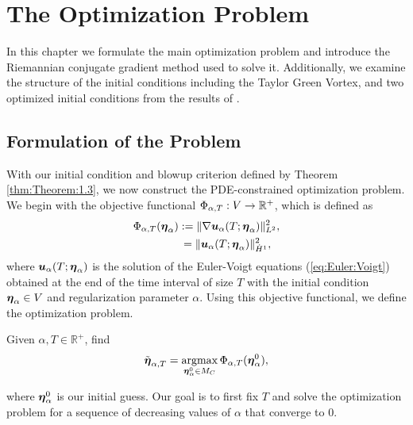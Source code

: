 \chapter{The Optimization Problem}\label{chapter:3}

In this chapter we formulate the main optimization problem and introduce the Riemannian conjugate gradient method used to solve it. {\color{red}Additionally, we examine the structure of the initial conditions including the Taylor Green Vortex, and two optimized initial conditions from the results of \cite{zhao_systematic_2023}.}

\section{Formulation of the Problem}

With our initial condition and blowup criterion defined by Theorem \ref{thm:Theorem:1.3}, we now construct the PDE-constrained optimization problem. We begin with the objective functional $\Phi_{\alpha,T}: V\rightarrow \mathbb{R}^+$, which is defined as
\begin{subequations}\label{eq:objective:functional}
\begin{align}
\Phi_{\alpha,T}({\boldsymbol \eta_\alpha}) &:= \|\nabla \boldsymbol u_\alpha(T;{\boldsymbol \eta_\alpha})\|_{L^2}^2,\label{eq:objective:functional:1}\\
&\,= \|\boldsymbol u_\alpha(T;{\boldsymbol \eta_\alpha})\|_{\dot{H}^1}^2,\label{eq:objective:functional:2}
\end{align}
\end{subequations}
where $\boldsymbol u_\alpha(T;{\boldsymbol \eta_\alpha})$ is the solution of the Euler-Voigt equations (\ref{eq:Euler:Voigt}) obtained at the end of the time interval of size $T$ with the initial condition ${\boldsymbol \eta_\alpha}\in V$ and regularization parameter $\alpha$. Using this objective functional, we define the optimization problem.
\begin{prb}\label{eq:problem}
Given $\alpha, T\in\mathbb{R}^+$, find
\begin{equation}
\tilde{{\boldsymbol \eta}}_{\alpha,T} = \operatorname*{argmax}_{{\boldsymbol \eta_\alpha^0} \in M_C}\Phi_{\alpha,T}({\boldsymbol \eta_\alpha^0}),
\end{equation}
\end{prb}
\noindent where ${\boldsymbol \eta_\alpha^0}$ is our initial guess. Our goal is to first fix $T$ and solve the optimization problem for a sequence of decreasing values of $\alpha$ that converge to 0. 
